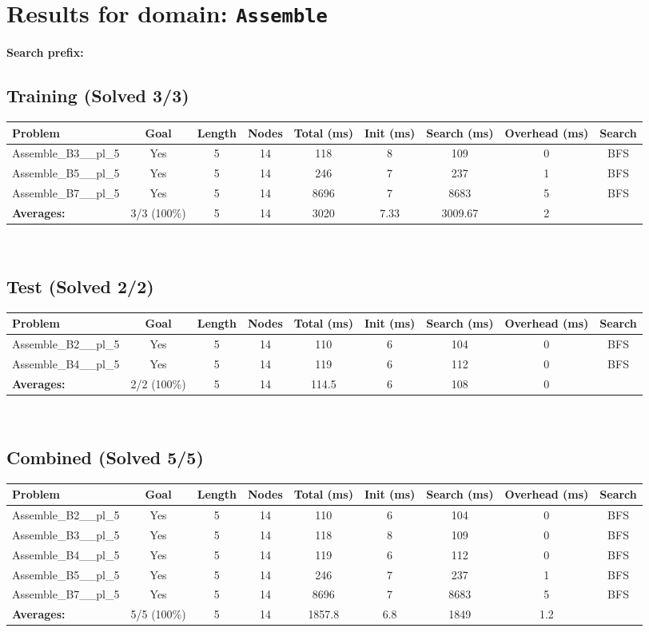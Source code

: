 \documentclass{article}
\begin{document}
\section*{Results for domain: \texttt{Assemble}}
\textbf{Search prefix:} 
\\[0.5cm]
\subsection*{Training (Solved 3/3)}
\begin{tabular}{lcccccccc}
\toprule
Problem & Goal & Length & Nodes & Total (ms) & Init (ms) & Search (ms) & Overhead (ms) & Search \\
\midrule
Assemble\_B3\_\_pl\_5 & Yes & 5 & 14 & 118 & 8 & 109 & 0 & BFS \\
Assemble\_B5\_\_pl\_5 & Yes & 5 & 14 & 246 & 7 & 237 & 1 & BFS \\
Assemble\_B7\_\_pl\_5 & Yes & 5 & 14 & 8696 & 7 & 8683 & 5 & BFS \\
\textbf{Averages:} & 3/3 (100\%) & 5 & 14 & 3020 & 7.33 & 3009.67 & 2 & \\
\bottomrule
\end{tabular}
\\[0.7cm]
\subsection*{Test (Solved 2/2)}
\begin{tabular}{lcccccccc}
\toprule
Problem & Goal & Length & Nodes & Total (ms) & Init (ms) & Search (ms) & Overhead (ms) & Search \\
\midrule
Assemble\_B2\_\_pl\_5 & Yes & 5 & 14 & 110 & 6 & 104 & 0 & BFS \\
Assemble\_B4\_\_pl\_5 & Yes & 5 & 14 & 119 & 6 & 112 & 0 & BFS \\
\textbf{Averages:} & 2/2 (100\%) & 5 & 14 & 114.5 & 6 & 108 & 0 & \\
\bottomrule
\end{tabular}
\\[0.7cm]
\subsection*{Combined (Solved 5/5)}
\begin{tabular}{lcccccccc}
\toprule
Problem & Goal & Length & Nodes & Total (ms) & Init (ms) & Search (ms) & Overhead (ms) & Search \\
\midrule
Assemble\_B2\_\_pl\_5 & Yes & 5 & 14 & 110 & 6 & 104 & 0 & BFS \\
Assemble\_B3\_\_pl\_5 & Yes & 5 & 14 & 118 & 8 & 109 & 0 & BFS \\
Assemble\_B4\_\_pl\_5 & Yes & 5 & 14 & 119 & 6 & 112 & 0 & BFS \\
Assemble\_B5\_\_pl\_5 & Yes & 5 & 14 & 246 & 7 & 237 & 1 & BFS \\
Assemble\_B7\_\_pl\_5 & Yes & 5 & 14 & 8696 & 7 & 8683 & 5 & BFS \\
\textbf{Averages:} & 5/5 (100\%) & 5 & 14 & 1857.8 & 6.8 & 1849 & 1.2 & \\
\bottomrule
\end{tabular}
\\[0.7cm]
\end{document}

